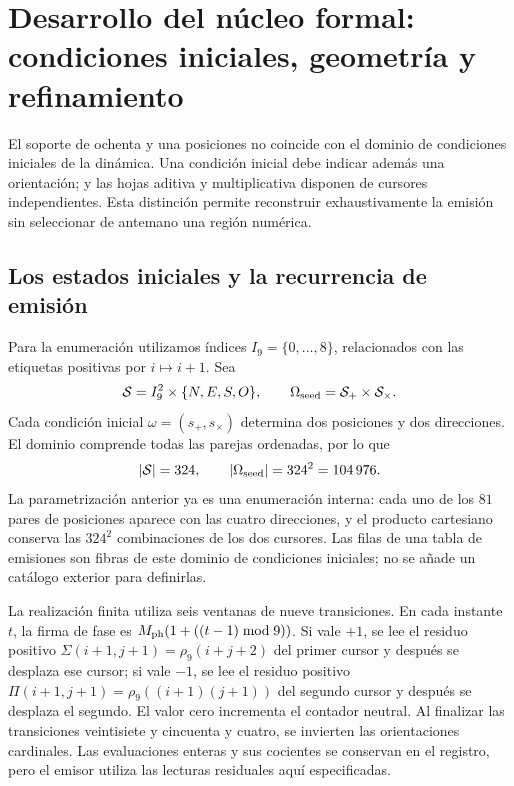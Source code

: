 \section{Desarrollo del núcleo formal: condiciones iniciales, geometría y refinamiento}
\label{sec:extension}

El soporte de ochenta y una posiciones no coincide con el dominio de condiciones iniciales de la dinámica. Una condición inicial debe indicar además una orientación; y las hojas aditiva y multiplicativa disponen de cursores independientes. Esta distinción permite reconstruir exhaustivamente la emisión sin seleccionar de antemano una región numérica.

\subsection{Los estados iniciales y la recurrencia de emisión}

Para la enumeración utilizamos índices \(I_9=\{0,\ldots,8\}\), relacionados con las etiquetas positivas por \(i\mapsto i+1\). Sea
\[
 \mathcal S=I_9^2\times\{N,E,S,O\},\qquad
 \Omega_{\rm seed}=\mathcal S_+\times\mathcal S_\times.
\]
Cada condición inicial \(\omega=(s_+,s_\times)\) determina dos posiciones y dos direcciones. El dominio comprende todas las parejas ordenadas, por lo que
\begin{equation}
 |\mathcal S|=324,\qquad |\Omega_{\rm seed}|=324^2=104\,976.
 \label{eq:semillas}
\end{equation}
La parametrización anterior ya es una enumeración interna: cada uno de los
\(81\) pares de posiciones aparece con las cuatro direcciones, y el producto
cartesiano conserva las \(324^2\) combinaciones de los dos cursores. Las filas
de una tabla de emisiones son fibras de este dominio de condiciones iniciales;
no se añade un catálogo exterior para definirlas.

La realización finita utiliza seis ventanas de nueve transiciones. En cada instante \(t\), la firma de fase es \(M_{\rm ph}(1+((t-1)\bmod9))\). Si vale \(+1\), se lee el residuo positivo \(\Sigma(i+1,j+1)=\rho_9(i+j+2)\) del primer cursor y después se desplaza ese cursor; si vale \(-1\), se lee el residuo positivo \(\Pi(i+1,j+1)=\rho_9((i+1)(j+1))\) del segundo cursor y después se desplaza el segundo. El valor cero incrementa el contador neutral. Al finalizar las transiciones veintisiete y cincuenta y cuatro, se invierten las orientaciones cardinales. Las evaluaciones enteras y sus cocientes se conservan en el registro, pero el emisor utiliza las lecturas residuales aquí especificadas.

